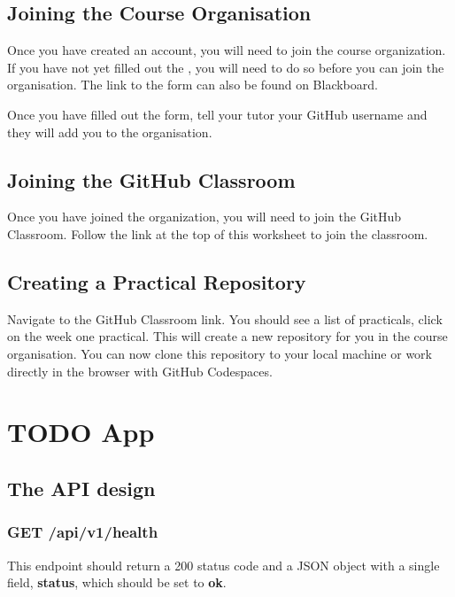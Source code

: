 \documentclass{csse4400}
\begin{document}
\subsection{Joining the Course Organisation}
Once you have created an account, you will need to join the course organization.
If you have not yet filled out the ,
you will need to do so before you can join the organisation.
The link to the form can also be found on Blackboard.

Once you have filled out the form,
tell your tutor your GitHub username and they will add you to the organisation.

\subsection{Joining the GitHub Classroom}
Once you have joined the organization,
you will need to join the GitHub Classroom.
Follow the link at the top of this worksheet to join the classroom.

\subsection{Creating a Practical Repository}
Navigate to the GitHub Classroom link.
You should see a list of practicals, click on the week one practical.
This will create a new repository for you in the course organisation.
You can now clone this repository to your local machine or work directly in the browser with GitHub Codespaces.


\section{TODO App}

\subsection{The API design}

\subsubsection{GET /api/v1/health}
This endpoint should return a 200 status code and a JSON object with a single field, \textbf{status}, which should be set to \textbf{ok}.
\end{document}
